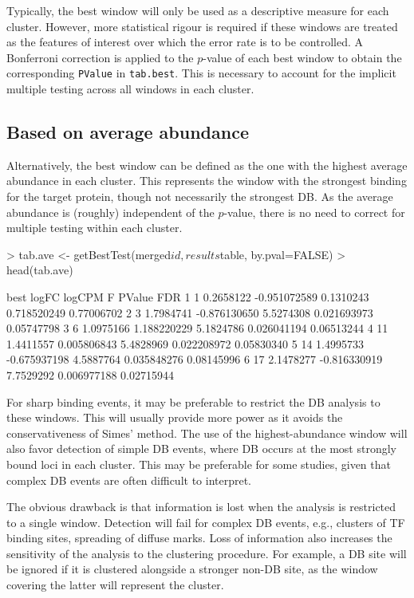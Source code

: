 \documentclass[12pt]{report}
\renewenvironment{Schunk}{\vspace{0pt}}{\vspace{0pt}}
\newcommand{\code}[1]{{\small\texttt{#1}}}
\begin{document}
Typically, the best window will only be used as a descriptive measure for each cluster.
However, more statistical rigour is required if these windows are treated as the features of interest over which the error rate is to be controlled.
A Bonferroni correction is applied to the $p$-value of each best window to obtain the corresponding \code{PValue} in \code{tab.best}.
This is necessary to account for the implicit multiple testing across all windows in each cluster.

\subsection{Based on average abundance}
Alternatively, the best window can be defined as the one with the highest average abundance in each cluster.
This represents the window with the strongest binding for the target protein, though not necessarily the strongest DB.
As the average abundance is (roughly) independent of the $p$-value, there is no need to correct for multiple testing within each cluster.

\begin{Schunk}
\begin{Sinput}
> tab.ave <- getBestTest(merged$id, results$table, by.pval=FALSE)
> head(tab.ave)
\end{Sinput}
\begin{Soutput}
  best     logFC       logCPM         F      PValue        FDR
1    1 0.2658122 -0.951072589 0.1310243 0.718520249 0.77006702
2    3 1.7984741 -0.876130650 5.5274308 0.021693973 0.05747798
3    6 1.0975166  1.188220229 5.1824786 0.026041194 0.06513244
4   11 1.4411557  0.005806843 5.4828969 0.022208972 0.05830340
5   14 1.4995733 -0.675937198 4.5887764 0.035848276 0.08145996
6   17 2.1478277 -0.816330919 7.7529292 0.006977188 0.02715944
\end{Soutput}
\end{Schunk}

For sharp binding events, it may be preferable to restrict the DB analysis to these windows.
This will usually provide more power as it avoids the conservativeness of Simes' method.
The use of the highest-abundance window will also favor detection of simple DB events, where DB occurs at the most strongly bound loci in each cluster.
This may be preferable for some studies, given that complex DB events are often difficult to interpret.

The obvious drawback is that information is lost when the analysis is restricted to a single window.
Detection will fail for complex DB events, e.g., clusters of TF binding sites, spreading of diffuse marks.
Loss of information also increases the sensitivity of the analysis to the clustering procedure.
For example, a DB site will be ignored if it is clustered alongside a stronger non-DB site, as the window covering the latter will represent the cluster.
\end{document}
